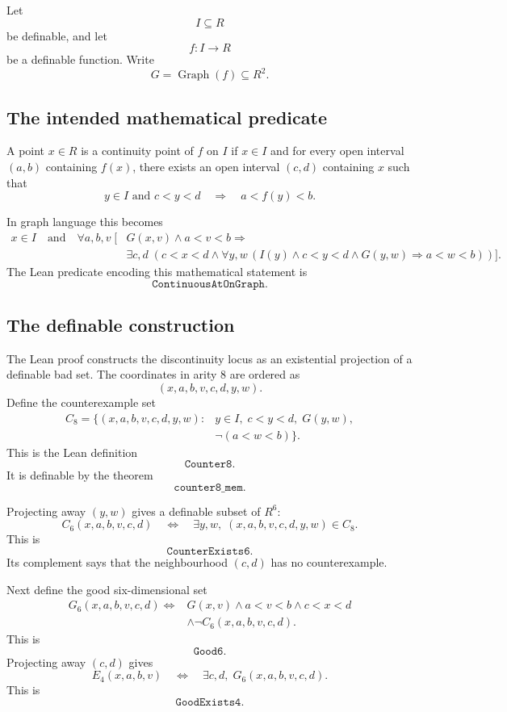 \documentclass[11pt]{article}
\newcommand{\Graph}{\operatorname{Graph}}
\newcommand{\Lean}[1]{\texttt{#1}}
\begin{document}
Let
\[
  I\subseteq R
\]
be definable, and let
\[
  f:I\to R
\]
be a definable function.  Write
\[
  G=\Graph(f)\subseteq R^2.
\]

\subsection{The intended mathematical predicate}

A point $x\in R$ is a continuity point of $f$ on $I$ if $x\in I$ and for every open interval
$(a,b)$ containing $f(x)$, there exists an open interval $(c,d)$ containing $x$ such that
\[
  y\in I\text{ and }c<y<d
  \quad\Longrightarrow\quad
  a<f(y)<b.
\]

In graph language this becomes
\[
\begin{aligned}
  x\in I
  \quad\text{and}\quad
  \forall a,b,v\;[&G(x,v)\land a<v<b\Rightarrow{}\\
  &\exists c,d\;(c<x<d\land
  \forall y,w\,(I(y)\land c<y<d\land G(y,w)\Rightarrow a<w<b))].
\end{aligned}
\]
The Lean predicate encoding this mathematical statement is
\[
  \Lean{ContinuousAtOnGraph}.
\]

\subsection{The definable construction}

The Lean proof constructs the discontinuity locus as an existential projection of a definable bad set.
The coordinates in arity $8$ are ordered as
\[
  (x,a,b,v,c,d,y,w).
\]
Define the counterexample set
\[
\begin{aligned}
  C_8=\bigl\{(x,a,b,v,c,d,y,w):{}&
  y\in I,
  \;c<y<d,
  \;G(y,w),\\
  &\neg(a<w<b)
  \bigr\}.
\end{aligned}
\]
This is the Lean definition
\[
  \Lean{Counter8}.
\]
It is definable by the theorem
\[
  \Lean{counter8\_mem}.
\]

Projecting away $(y,w)$ gives a definable subset of $R^6$:
\[
  C_6(x,a,b,v,c,d)
  \quad\Longleftrightarrow\quad
  \exists y,w,
  \;(x,a,b,v,c,d,y,w)
  \in C_8.
\]
This is
\[
  \Lean{CounterExists6}.
\]
Its complement says that the neighbourhood $(c,d)$ has no counterexample.

Next define the good six-dimensional set
\[
\begin{aligned}
  G_6(x,a,b,v,c,d)
  \Longleftrightarrow{}&
  G(x,v)
  \land a<v<b
  \land c<x<d\\
  &\land \neg C_6(x,a,b,v,c,d).
\end{aligned}
\]
This is
\[
  \Lean{Good6}.
\]
Projecting away $(c,d)$ gives
\[
  E_4(x,a,b,v)
  \quad\Longleftrightarrow\quad
  \exists c,d,
  \;G_6(x,a,b,v,c,d).
\]
This is
\[
  \Lean{GoodExists4}.
\]
\end{document}
